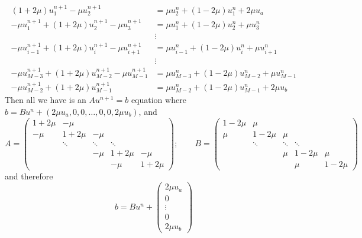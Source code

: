 \documentclass[reqno]{amsart}
\theoremstyle{definition}
\begin{document}
%
\begin{align*}
(1+2\mu)u_1^{n+1} -\mu u_2^{n+1} &= \mu u_2^n + (1-2\mu)u_1^n + 2\mu u_a\\
-\mu u_1^{n+1} + (1+2\mu)u_2^{n+1} - \mu u_3^{n+1} &= \mu u_1^n + (1-2\mu)u_2^n + \mu u_3^n\\
&\vdots\\
-\mu u_{i-1}^{n+1} + (1+2\mu)u_i^{n+1} - \mu u_{i+1}^{n+1} &= \mu u_{i-1}^n + (1-2\mu)u_i^n + \mu u_{i+1}^n\\
&\vdots\\
-\mu u_{M-3}^{n+1} + (1+2\mu)u_{M-2}^{n+1} - \mu u_{M-1}^{n+1} &= \mu u_{M-3}^n + (1-2\mu)u_{M-2}^n + \mu u_{M-1}^n\\
-\mu u_{M-2}^{n+1} + (1+2\mu)u_{M-1}^{n+1} &= \mu u_{M-2}^n + (1-2\mu)u_{M-1}^n + 2\mu u_b
\end{align*}
%
Then all we have is an $Au^{n+1} = b$ equation where $b = Bu^n + (2\mu u_a, 0, 0, \ldots, 0, 0, 2\mu u_b)$, and
%
\begin{equation}
A = \begin{pmatrix}
1 + 2\mu & -\mu & & &  \\
-\mu & 1 + 2\mu & -\mu & & \\
 & \ddots & \ddots & \ddots & \\
 & & -\mu & 1 + 2\mu & -\mu\\
 & & & -\mu & 1 + 2\mu
\end{pmatrix}; \qquad B = \begin{pmatrix}
1 - 2\mu & \mu & & &  \\
\mu & 1 - 2\mu & \mu & & \\
 & \ddots & \ddots & \ddots & \\
 & & \mu & 1 - 2\mu & \mu\\
 & & & \mu & 1 - 2\mu
\end{pmatrix}
\end{equation}
%
and therefore
%
\begin{equation}
b = Bu^n + \begin{pmatrix}
2\mu u_a\\
0\\
\vdots\\
0\\
2\mu u_b
\end{pmatrix}
\end{equation}
\end{document}

